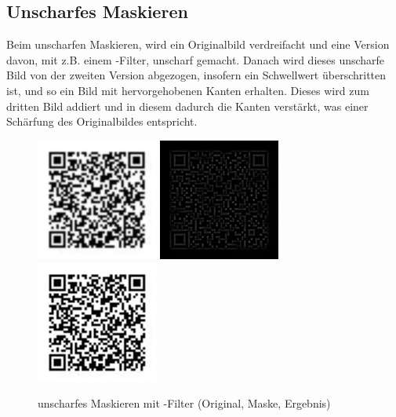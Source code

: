 \subsection*{Unscharfes Maskieren}
\label{sec:unsharp}
Beim unscharfen Maskieren, wird ein Originalbild verdreifacht und eine Version davon, mit z.B. einem -Filter, unscharf gemacht.
Danach wird dieses unscharfe Bild von der zweiten Version abgezogen, insofern ein Schwellwert überschritten ist, und so ein Bild mit hervorgehobenen Kanten erhalten.
Dieses wird zum dritten Bild addiert und in diesem dadurch die Kanten verstärkt, was einer Schärfung des Originalbildes entspricht.~\cite{Pratt1991}
\begin{figure}[H]
  \centering
  \includegraphics[height=4cm]{img/QR/blurry_03_3.jpg}
  \includegraphics[height=4cm]{img/QR/qr-unsharpmask.jpg}
  \includegraphics[height=4cm]{img/QR/qr-unsharpmask-sharp.jpg}
  \caption[unscharfes Maskieren mit -Filter]{unscharfes Maskieren mit -Filter (Original, Maske, Ergebnis)}
  \label{fig:unsharpmask}
\end{figure}


